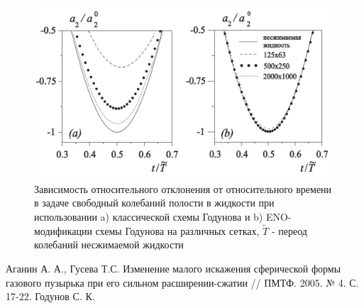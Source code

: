 \documentclass{article}
\begin{document}
\newpage
\begin{figure}[h]
\centering
\captionsetup{format=hang,justification=raggedright}
\includegraphics[scale=0.4]{pic.jpg}
\caption{Зависимость относительного отклонения от относительного времени в задаче свободный колебаний полости в жидкости при использовании a) классической схемы Годунова и b) ENO-модификации схемы Годунова на различных сетках, {$\widetilde{T}$} -  переод колебаний несжимаемой жидкости}
\end{figure}

\begin{thebibliography}{}
      Аганин А. А., Гусева Т.С. Изменение малого искажения сферической формы газового пузырька при его сильном расширении-сжатии // ПМТФ. 2005. № 4. С. 17-22.
      Годунов С. К.
\end{thebibliography}
\end{document}
